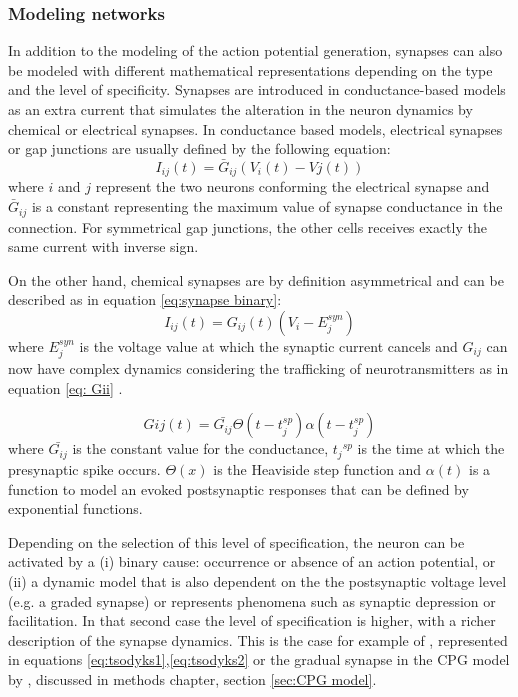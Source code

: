 \subsubsection{\large{Modeling networks}}
\label{c-intro-synapses}
In addition to the modeling of the action potential generation, synapses can also be modeled with different mathematical representations depending on the type and the level of specificity. Synapses are introduced in conductance-based models as an extra current that simulates the alteration in the neuron dynamics by chemical or electrical synapses. In conductance based models, electrical synapses or gap junctions are usually defined by the following equation:
\begin{equation}
    I_{ij}(t) = \bar{G}_{ij} (V_i(t) - Vj(t))
\end{equation}
\noindent where $i$ and $j$ represent the two neurons conforming the electrical synapse and $\bar{G}_{ij}$ is a constant representing the maximum value of synapse conductance in the connection. For symmetrical gap junctions, the other cells receives exactly the same current with inverse sign.

On the other hand, chemical synapses are by definition asymmetrical and can be described as in equation \ref{eq:synapse binary}:
\begin{equation}
     I_{ij}(t) = G_{ij}(t) (V_i - E_j^{syn})
     \label{eq:synapse binary}
\end{equation}
\noindent where $E_j^{syn}$ is the voltage value at which the synaptic current cancels and $G_{ij}$ can now have complex dynamics considering the trafficking of neurotransmitters as in equation \ref{eq: Gii} \parencite{torres_modeling_2012}. 

\begin{equation}
	G{ij}(t) = \bar{G_{ij}}  \Theta(t-t_j^{sp}) \alpha (t-t_j^{sp})
	\label{eq: Gii}
\end{equation}
\noindent where $\bar{G_{ij}}$ is the constant value for the conductance, ${t_j}^{sp}$ is the time at which the presynaptic spike occurs. $\Theta(x)$ is the Heaviside step function and $\alpha(t)$ is a function to model an evoked postsynaptic responses that can be defined by exponential functions.

Depending on the selection of this level of specification, the neuron can be activated by a (i) binary cause: occurrence or absence of an action potential, or (ii) a dynamic model that is also dependent on the the postsynaptic voltage level (e.g. a graded synapse) or represents phenomena such as synaptic depression or facilitation. In that second case the level of specification is higher, with a richer description of the synapse dynamics. This is the case for example of \cite{tsodyks_neural_1997}, represented in equations \ref{eq:tsodyks1},\ref{eq:tsodyks2} or the gradual synapse in the CPG model by \cite{vavoulis_dynamic_2007}, discussed in methods chapter, section \ref{sec:CPG model}.


